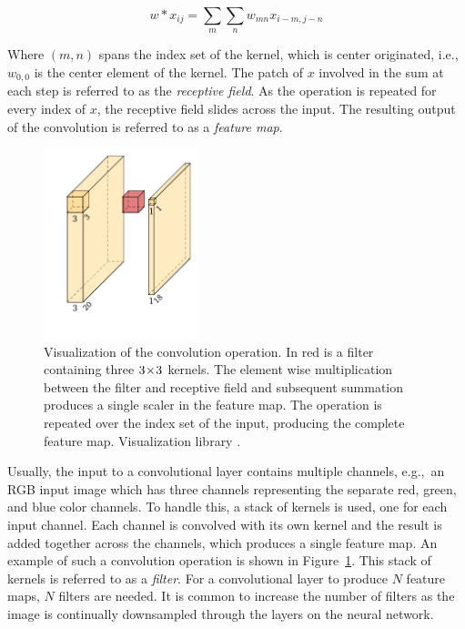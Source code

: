 \[w\ast x_{ij}=\sum_{m}\sum_{n}  w_{mn}x_{i-m,j-n}\]

Where \((m,n)\) spans the index set of the kernel, which is center originated, i.e., \(w_{0,0}\) is the center element of the kernel.
The patch of \(x\) involved in the sum at each step is referred to as the \textit{receptive field}.
As the operation is repeated for every index of \(x\), the receptive field slides across the input.
The resulting output of the convolution is referred to as a \textit{feature map}.

\begin{figure}[htb]
  \centering
  \includegraphics[width=0.4\textwidth]{figs/background/conv.pdf}
  \caption[Convolution operation]{Visualization of the convolution operation.
In red is a filter containing three \(3\!\times \! 3\) kernels.
The element wise multiplication between the filter and receptive field and subsequent summation produces a single scaler in the feature map.
The operation is repeated over the index set of the input, producing the complete feature map.
Visualization library \parencite{haris_2018}.}\label{fig:cnn}
\end{figure}

Usually, the input to a convolutional layer contains multiple channels, e.g.,\ an RGB input image which has three channels representing the separate red, green, and blue color channels.
To handle this, a stack of kernels is used, one for each input channel.
Each channel is convolved with its own kernel and the result is added together across the channels, which produces a single feature map.
An example of such a convolution operation is shown in Figure~\ref{fig:cnn}.
This stack of kernels is referred to as a \textit{filter}.
For a convolutional layer to produce \(N\) feature maps, \(N\) filters are needed.
It is common to increase the number of filters as the image is continually downsampled through the layers on the neural network.


